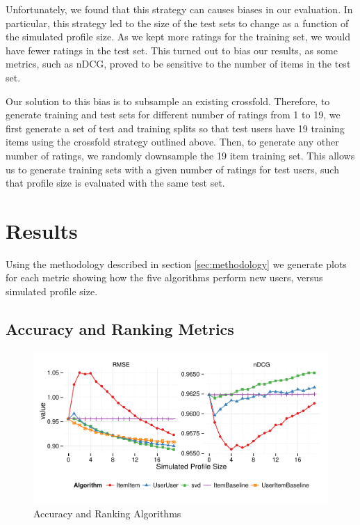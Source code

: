 \documentclass[letterpaper]{sig-alternate}
\begin{document}
  Unfortunately, we found that this strategy can causes biases in our evaluation.
  In particular, this strategy led to the size of the test sets to change as a function of the simulated profile size.
  As we kept more ratings for the training set, we would have fewer ratings in the test set.
  This turned out to bias our results, as some metrics, such as nDCG, proved to be sensitive to the number of items in the test set.
  
  Our solution to this bias is to subsample an existing crossfold.
  Therefore, to generate training and test sets for different number of ratings from 1 to 19, we first generate a set of test and training splits so that test users have 19 training items using the crossfold strategy outlined above.
  Then, to generate any other number of ratings, we randomly downsample the 19 item training set.
  This allows us to generate training sets with a given number of ratings for test users, such that profile size is evaluated with the same test set.


\section{Results}

  Using the methodology described in section \ref{sec:methodology} we generate plots for each metric showing how the five algorithms perform new users, versus simulated profile size.

  
\subsection{Accuracy and Ranking Metrics}

\begin{figure}[ht!]
  \centering
  \includegraphics[width=0.75\linewidth]{../lenskit/output/ekstrandTuned20/accuracy.pdf}
  \caption{Accuracy and Ranking Algorithms}
  \label{fig:rmse}
  \label{fig:ndcg}
\end{figure}
\end{document}
